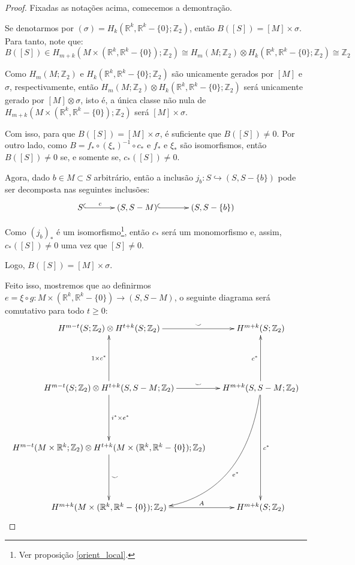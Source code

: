 \documentclass[12pt,oneside]{book} %
\newcommand{\R}{\mathbb{R}}
\newcommand{\Z}{\mathbb{Z}}
\newcommand{\ccup}{\smile}
\newcommand{\tensor}{\otimes}
\begin{document}
\begin{proof}
	\par Fixadas as notações acima, comecemos a demontração.
	
	\par Se denotarmos por $(\sigma)=H_{k}(\R^{k},\R^{k}-\{0\};\Z_{2})$, então $B([S])=[M]\times\sigma$. Para tanto, note que:
	$$ B([S])\in H_{m+k}(M\times (\R^{k},\R^{k}-\{0\});\Z_{2})\cong H_{m}(M;\Z_{2})\tensor H_{k}(\R^{k},\R^{k}-\{0\};\Z_{2})\cong \Z_{2} $$
	
	\par Como $H_{m}(M;\Z_{2})$ e $H_{k}(\R^{k},\R^{k}-\{0\};\Z_{2})$ são unicamente gerados por $[M]$ e $\sigma$, respectivamente, então $H_{m}(M;\Z_{2})\tensor H_{k}(\R^{k},\R^{k}-\{0\};\Z_{2})$ será unicamente gerado por $[M]\tensor\sigma$, isto é, a única classe não nula de $H_{m+k}(M\times (\R^{k},\R^{k}-\{0\});\Z_{2})$ será $[M]\times\sigma$.
	
	\par Com isso, para que $B([S])=[M]\times\sigma$, é suficiente que $B([S])\neq 0$. Por outro lado, como $B=f_{*}\circ (\xi_{*})^{-1}\circ c_{*}$ e $f_{*}$ e $\xi_{*}$ são isomorfismos, então $B([S])\neq 0$ se, e somente se, $c_{*}([S])\neq 0$.
	
	\par Agora, dado $b\in M\subset S$ arbitrário, então a inclusão $j_{b}:S\hookrightarrow (S,S-\{b\})$ pode ser decomposta nas seguintes inclusões:
	$$ \xymatrix @C=0.5cm {
		S \ar@{^(->}[rr]^-{c} && (S,S-M) \ar@{^(->}[rr] && (S,S-\{b\})
	} $$
	
	\par Como $(j_{b})_{*}$ é um isomorfismo\footnote{Ver proposição \ref{orient_local}.}, então $c_{*}$ será um monomorfismo e, assim, $c_{*}([S])\neq 0$ uma vez que $[S]\neq 0$.
	
	\par Logo, $B([S])=[M]\times\sigma$.
	
	\par Feito isso, mostremos que ao definirmos $e=\xi\circ g:M\times (\R^{k},\R^{k}-\{0\})\to (S,S-M)$, o seguinte diagrama será comutativo para todo $t\geq 0$:
	$$ \xymatrix @C=0.5cm {
		H^{m-t}(S;\Z_{2})\tensor H^{t+k}(S;\Z_{2}) \ar[r]^-{\ccup} & H^{m+k}(S;\Z_{2}) \\
		& \\		 
		H^{m-t}(S;\Z_{2})\tensor H^{t+k}(S,S-M;\Z_{2}) \ar[uu]^-{1\times c^{*}} \ar[r]^-{\ccup} \ar[dd]^-{i^{*}\times e^{*}} & H^{m+k}(S,S-M;\Z_{2}) \ar[uu]^-{c^{*}} \ar@/^2cm/[ldddd]^-{e^{*}} \ar[dddd]^-{c^{*}} \\
		& \\				
		H^{m-t}(M\times\R^{k};\Z_{2})\tensor H^{t+k}(M\times (\R^{k},\R^{k}-\{0\});\Z_{2}) \ar[dd]^-{\ccup} & \\
		& \\	
		H^{m+k}(M\times (\R^{k},\R^{k}-\{0\});\Z_{2}) \ar[r]^-{A} & H^{m+k}(S;\Z_{2})
	} $$
	

\end{proof}
\end{document}
